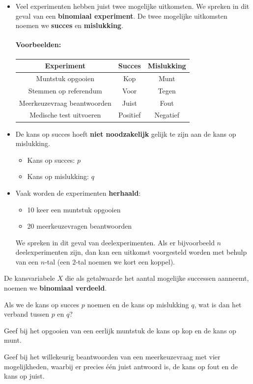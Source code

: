 \documentclass[a4paper,12pt, twoside]{article}
\begin{document}
\begin{itemize}
  \item Veel experimenten hebben juist twee mogelijke uitkomsten. We spreken in dit geval van een {\bf binomiaal experiment}. De twee mogelijke uitkomsten noemen we {\bf succes} en {\bf mislukking}.
  \paragraph*{Voorbeelden:}
  \begin{center}
    \begin{tabular}{c|c|c}
    Experiment & Succes & Mislukking\\
    \hline
    Muntstuk opgooien & Kop & Munt\\
    Stemmen op referendum & Voor & Tegen\\
    Meerkeuzevraag beantwoorden & Juist & Fout\\
    Medische test uitvoeren & Positief & Negatief\\
    \end{tabular}
  \end{center}
  \item De kans op succes hoeft {\bf niet noodzakelijk} gelijk te zijn aan de kans op mislukking.
  \begin{itemize}
    \item Kans op succes: $p$
    \item Kans op mislukking: $q$
  \end{itemize}
  \item Vaak worden de experimenten {\bf herhaald}:
  \begin{itemize}
    \item 10 keer een muntstuk opgooien
    \item 20 meerkeuzevragen beantwoorden
  \end{itemize}
  We spreken in dit geval van deelexperimenten. Als er bijvoorbeeld $n$ deelexperimenten zijn, dan kan een uitkomst voorgesteld worden met behulp van een $n$-tal (een $2$-tal noemen we kort een koppel).
\end{itemize}

De kansvariabele $X$ die als getalwaarde het aantal mogelijke successen aanneemt, noemen we {\bf binomiaal verdeeld}.

\begin{oefening}
  Als we de kans op succes $p$ noemen en de kans op mislukking $q$, wat is dan het verband tussen $p$ en $q$?
\end{oefening}
\begin{oefening}
  Geef bij het opgooien van een eerlijk muntstuk de kans op kop en de kans op munt.
\end{oefening}
\begin{oefening}
  Geef bij het willekeurig beantwoorden van een meerkeuzevraag met vier mogelijkheden, waarbij er precies één juist antwoord is, de kans op fout en de kans op juist.
\end{oefening}
\end{document}

